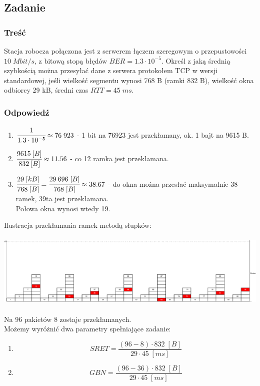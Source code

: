 \documentclass[a4paper,twoside]{article}
\begin{document}
\subsection{Zadanie}
\subsubsection{Treść}
Stacja robocza połączona jest z serwerem łączem szeregowym o przepustowości $ 10\;Mbit/s $, z bitową stopą błędów $ BER=1.3\cdot 10^{-5} $. Określ z jaką średnią szybkością można przesyłać dane z serwera protokołem TCP w wersji standardowej, jeśli wielkość segmentu wynosi 768 B (ramki 832 B), wielkość okna odbiorcy 29 kB, średni czas $ RTT=45\;ms $.
\subsubsection{Odpowiedź}
\begin{enumerate}
	\item $ \cfrac{1}{1.3\cdot 10^{-5}}\approx 76\;923 $ - 1 bit na 76923 jest przekłamany, ok. 1 bajt na 9615 B.
	\item $ \cfrac{9615\:[B]}{832\:[B]}\approx11.56 $ - co 12 ramka jest przekłamana.
	\item $ \cfrac{29\;[kB]}{768\;[B]}=\cfrac{29\:696\;[B]}{768\;[B]}\approx 38.67 $ - do okna można przesłać maksymalnie 38 ramek, 39ta jest przekłamana.\\
	Połowa okna wynosi wtedy 19.
\end{enumerate}
Ilustracja przekłamania ramek metodą słupków:\\\\
\includegraphics[width=16.0cm]{./images/zadanie08.pdf}\\\\
Na 96 pakietów 8 zostaje przekłamanych.\\
Możemy wyróżnić dwa parametry spełniające zadanie:
\begin{enumerate}
	\item $$ SRET=\frac{(96-8)\cdot 832\;[B]}{29\cdot 45\;[ms]} $$
	\item $$ GBN=\frac{(96-36)\cdot 832\;[B]}{29\cdot 45\;[ms]} $$
\end{enumerate}
\newpage
\end{document}
